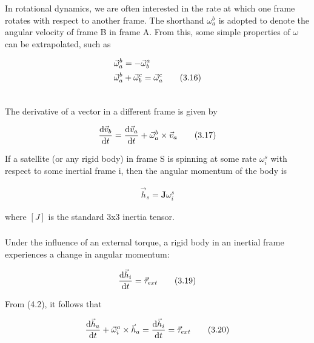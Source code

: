 \documentclass{article}
\begin{document}
In rotational dynamics, we are often interested in the rate at which one frame rotates with respect to another frame. The shorthand $\omega_{a}^b$ is adopted to denote the angular velocity of frame B in frame A. From this, some simple properties of $\omega$ can be extrapolated, such as 

\begin{alignat}{1}
    &\vec{\omega}_{a}^b = -\vec{\omega}_{b}^a \notag \\
    &\vec{\omega}_{a}^b + \vec{\omega}_{b}^c = \vec{\omega}_{a}^c \tag{3.16} \\ \notag
\end{alignat}

\noindent The derivative of a vector in a different frame is given by

\begin{align}
    \frac{\textup{d}\vec{v}_{b}}{\textup{d}t} = \frac{\textup{d}\vec{v}_{a}}{\textup{d}t} + \vec{\omega}^b_{a}\times \vec{v}_{a} \tag{3.17}
\end{align}

If a satellite (or any rigid body) in frame S is spinning at some rate $\omega^s_{i}$ with respect to some inertial frame i, then the angular momentum of the body is 

\begin{align}
    \vec{h}_{s} = \mathbf{J} \omega^s_{i} \tag{3.18}
\end{align}

\noindent where $[J]$ is the standard 3x3 inertia tensor.

\subsubsection{\color{black}{Equations of Motion}}

Under the influence of an external torque, a rigid body in an inertial frame experiences a change in angular momentum:

\begin{align}
    \frac{\textup{d} \vec{h}_{i}}{\textup{d} t} = \vec{\tau}_{ext} \tag{3.19} 
\end{align}

\noindent From (4.2), it follows that 

\begin{align}
    \frac{\textup{d}\vec{h}_{a}}{\textup{d}t} + \vec{\omega}^a_{i}\times \vec{h}_{a} = \frac{\textup{d}\vec{h}_{i}}{\textup{d}t} = \vec{\tau}_{ext} \tag{3.20}
\end{align}
\end{document}
